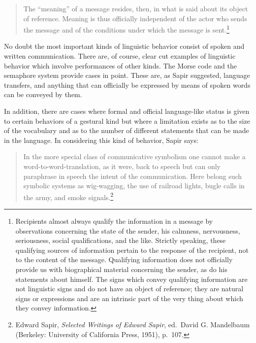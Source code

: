 \documentclass[openany,nobib]{tufte-book}
\begin{document}
\begin{quote}
\begin{enumerate}
  The ``meaning'' of a message resides, then, in what is said about its
  object of reference. Meaning is thus officially independent of the
  actor who sends the message and of the conditions under which the
  message is sent.\footnote{Recipients almost always qualify the
    information in a message by observations concerning the state of the
    sender, his calmness, nervousness, seriousness, social
    qualifications, and the like. Strictly speaking, these qualifying
    sources of information pertain to the response of the recipient, not
    to the content of the message. Qualifying information does not
    officially provide us with biographical material concerning the
    sender, as do his statements about himself. The signs which convey
    qualifying information are not linguistic signs and do not have an
    object of reference; they are natural signs or expressions and are
    an intrinsic part of the very thing about which they convey
    information.}
\end{enumerate}
\end{quote}

No doubt the most important kinds of linguistic behavior consist of
spoken and written communication. There are, of course, clear cut
examples of linguistic behavior which involve performances of other
kinds. The Morse code and the semaphore system provide cases in point.
These are, as Sapir suggested, language transfers, and anything that can
officially be expressed by means of spoken words can be conveyed by
them.

In addition, there are cases where formal and official language-like
status is given to certain behaviors of a gestural kind but where a
limitation exists as to the size of the vocabulary and as to the number
of different statements that can be made in the language. In considering
this kind of behavior, Sapir says:

\begin{quote}
In the more special class of communicative symbolism one cannot make a
word-to-word-translation, as it were, back to speech but can only
paraphrase in speech the intent of the communication. Here belong such
symbolic systems as wig-wagging, the use of railroad lights, bugle calls
in the army, and smoke signals.\footnote{Edward Sapir, \emph{Selected
  Writings of Edward Sapir}, ed.~David G. Mandelbaum (Berkeley:
  University of California Press, 1951), p.~107.}
\end{quote}
\end{document}

